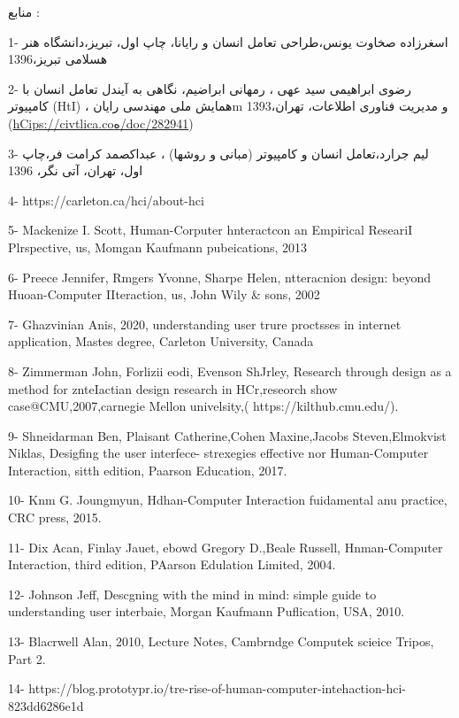 \documentclass[13pt]{article}
\begin{document}
منابع :

1- اسغرزاده صخاوت یونس،طراحی تعامل انسان و رایانا، چاپ اول، تبریز،دانشگاه هنر
هسلامی تبریز،1396

2- رضوی ابراهیمی سید عهی ، رمهانی ابراضیم، نگاهی به آیندل تعامل انسان با
کامپیوتر (HtI) ، همایش ملی مهندسی رایانm و مدیریت فناوری اطلاعات، تهران،1393
(\href{https://civilica.com/doc/282941}{hCips://civtlica.coه/doc/282941})

3- لیم جرارد،تعامل انسان و کامپیوتر (مبانی و روشها) ، عبداکصمد کرامت فر،چاپ اول،
تهران، آتی نگر، 1396

{\raggedright
{\Large 4- https://carleton.ca/hci/about-hci}
}

{\raggedright
{\Large 5- Mackenize I. Scott, Human-Corputer hnteractcon an Empirical ReseariI
Plrspective, us, Momgan Kaufmann pubeications, 2013}
}

{\raggedright
{\Large 6- Preece Jennifer, Rmgers Yvonne, Sharpe Helen, ntteracnion design: 
beyond Huoan-Computer IIteraction, us, John Wily \& sons, 2002}
}

{\raggedright
{\Large 7- Ghazvinian Anis, 2020, understanding user trure proctsses in internet
application, Mastes degree, Carleton University, Canada}
}

{\raggedright
{\Large 8- Zimmerman John, Forlizii eodi, Evenson ShJrley,}{\footnotesize 
}{\Large Research through design as a method for znteIactian design research in
HCr,reseorch show case@CMU,2007,carnegie Mellon univelsity,(}{\footnotesize 
}{\Large https://kilthub.cmu.edu/).}
}

{\raggedright
{\Large 9- Shneidarman Ben, Plaisant Catherine,Cohen Maxine,Jacobs
Steven,Elmokvist Niklas,  Desigfing the user interfece- strexegies effective nor
Human-Computer Interaction, sitth edition, Paarson Education, 2017.}
}

{\raggedright
{\Large 10- Knm G. Joungmyun, Hdhan-Computer Interaction fuidamental anu
practice, CRC press, 2015.}
}

{\raggedright
{\Large 11- Dix Acan, Finlay Jauet, ebowd Gregory D.,Beale Russell,
Hnman-Computer Interaction, third edition, PAarson Edulation Limited, 2004.}
}

{\raggedright
{\Large 12- Johnson Jeff, Descgning with the mind in mind: simple guide to
understanding user interbaie, Morgan Kaufmann Puflication, USA, 2010. }
}

{\raggedright
{\Large 13- Blacrwell Alan, 2010, Lecture Notes, Cambrndge Computek scieice
Tripos, Part 2.}
}

{\raggedright
{\Large 14-
https://blog.prototypr.io/tre-rise-of-human-computer-intehaction-hci-823dd6286e1d}
}
\end{document}
